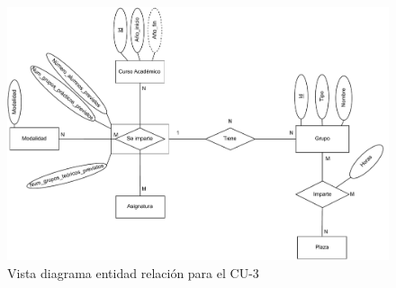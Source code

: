 \begin{figure}[!h]
	\centering
	\includegraphics[scale=0.8]{../img/Anexos/Casos uso/Vistas ER/Diagrama E-R CU 3.pdf}
	\caption{Vista diagrama entidad relación para el CU-3}\label{er_cu3}
\end{figure}
\FloatBarrier

\newpage
